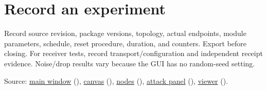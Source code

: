 \section*{Record an experiment}
\par\noindent\begin{minipage}{\linewidth}\setlength{\parskip}{5pt}
Record source revision, package versions, topology, actual endpoints, module parameters, schedule, reset procedure, duration, and counters. Export before closing. For receiver tests, record transport/configuration and independent receipt evidence. Noise/drop results vary because the GUI has no random-seed setting.
{\footnotesize\color{muted}\raggedright Source: \href{https://github.com/neerajjayesh/GridSec-project/blob/main/gui/main_window.py}{main window} (), \href{https://github.com/neerajjayesh/GridSec-project/blob/main/gui/canvas.py}{canvas} (), \href{https://github.com/neerajjayesh/GridSec-project/blob/main/gui/node_types.py}{nodes} (), \href{https://github.com/neerajjayesh/GridSec-project/blob/main/gui/attack_panel.py}{attack panel} (), \href{https://github.com/neerajjayesh/GridSec-project/blob/main/gui/waveform_viewer.py}{viewer} ().\par}
\end{minipage}\par

